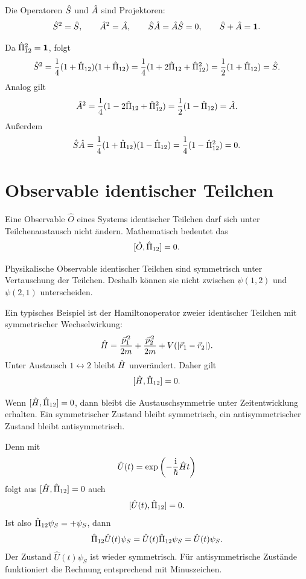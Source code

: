 \begin{conceptbox}
Die Operatoren \(\hat S\) und \(\hat A\) sind Projektoren:
\[
    \hat S^2=\hat S,
    \qquad
    \hat A^2=\hat A,
    \qquad
    \hat S\hat A=\hat A\hat S=0,
    \qquad
    \hat S+\hat A=\mathbf{1}.
\]
\end{conceptbox}

\begin{derivationbox}
Da \(\hat\Pi_{12}^2=\mathbf{1}\), folgt
\[
    \hat S^2
    =\frac{1}{4}(1+\hat\Pi_{12})(1+\hat\Pi_{12})
    =\frac{1}{4}(1+2\hat\Pi_{12}+\hat\Pi_{12}^2)
    =\frac{1}{2}(1+\hat\Pi_{12})
    =\hat S.
\]
Analog gilt
\[
    \hat A^2
    =\frac{1}{4}(1-2\hat\Pi_{12}+\hat\Pi_{12}^2)
    =\frac{1}{2}(1-\hat\Pi_{12})
    =\hat A.
\]
Außerdem
\[
    \hat S\hat A
    =\frac{1}{4}(1+\hat\Pi_{12})(1-\hat\Pi_{12})
    =\frac{1}{4}(1-\hat\Pi_{12}^2)=0.
\]
\end{derivationbox}

\section{Observable identischer Teilchen}

Eine Observable \(\hat O\) eines Systems identischer Teilchen darf sich unter Teilchenaustausch nicht ändern. Mathematisch bedeutet das
\[
    [\hat O,\hat\Pi_{12}]=0.
\]

\begin{conceptbox}
Physikalische Observable identischer Teilchen sind symmetrisch unter Vertauschung der Teilchen. Deshalb können sie nicht zwischen \(\psi(1,2)\) und \(\psi(2,1)\) unterscheiden.
\end{conceptbox}

Ein typisches Beispiel ist der Hamiltonoperator zweier identischer Teilchen mit symmetrischer Wechselwirkung:
\[
    \hat H
    = \frac{\vec p_1^{\,2}}{2m}
    + \frac{\vec p_2^{\,2}}{2m}
    + V(|\vec r_1-\vec r_2|).
\]
Unter Austausch \(1\leftrightarrow2\) bleibt \(\hat H\) unverändert. Daher gilt
\[
    [\hat H,\hat\Pi_{12}]=0.
\]

\begin{notebox}
Wenn \([\hat H,\hat\Pi_{12}]=0\), dann bleibt die Austauschsymmetrie unter Zeitentwicklung erhalten. Ein symmetrischer Zustand bleibt symmetrisch, ein antisymmetrischer Zustand bleibt antisymmetrisch.
\end{notebox}

Denn mit
\[
    \hat U(t)=\exp\left(-\frac{\mathrm{i}}{\hbar}\hat H t\right)
\]
folgt aus \([\hat H,\hat\Pi_{12}]=0\) auch
\[
    [\hat U(t),\hat\Pi_{12}]=0.
\]
Ist also \(\hat\Pi_{12}\psi_S=+\psi_S\), dann
\[
    \hat\Pi_{12}\hat U(t)\psi_S
    =\hat U(t)\hat\Pi_{12}\psi_S
    =\hat U(t)\psi_S.
\]
Der Zustand \(\hat U(t)\psi_S\) ist wieder symmetrisch. Für antisymmetrische Zustände funktioniert die Rechnung entsprechend mit Minuszeichen.

